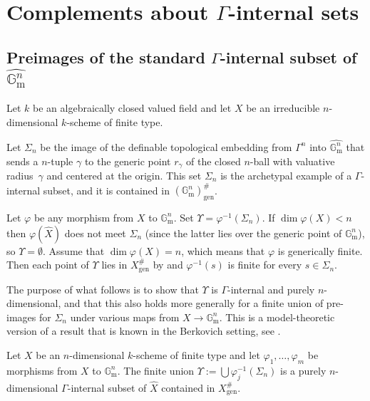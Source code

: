 \documentclass[JEP,XML,SOM,Unicode,ThmDefs,NoEqCountersInSection,published]{cedram}
\newcommand{\gm}{\bG_{\mathrm m}}
\newcommand{\bG}{\mathbb G}
\let\phi\varphi
\theoremstyle{plain}
\theoremstyle{definition}
\begin{document}
\section{Complements about \texorpdfstring{$\Gamma$}{G}-internal sets}

\subsection{Preimages of the standard $\Gamma$-internal subset of
$\widehat{\gm^n}$}\label{ss-preimsn}
Let $k$ be an algebraically
closed valued field
and let $X$ be an irreducible
$n$\nobreakdash-dimen\-sional $k$-scheme of finite type.

Let
$\Sigma_n$ be the image of the definable topological embedding from $\Gamma^n$ into $\widehat{\gm^n}$
that sends a $n$-tuple $\gamma$ to the generic point $r_\gamma$ of the closed $n$-ball with valuative radius~$\gamma$ and centered at the origin.
This set
$\Sigma_n$ is the archetypal example of a $\Gamma$-internal subset, and it is contained in $(\gm^n)^{\#}_{\mathrm{gen}}$.

Let $\phi$ be any morphism from $X$ to $\gm^n$. Set
$\Upsilon=\phi^{-1}(\Sigma_n)$.
If $\dim\phi(X)<n$ then $\phi(\widehat X)$ does not meet $\Sigma_n$ (since the latter lies over
the generic point of $\gm^n$), so $\Upsilon=\emptyset$.
Assume that $\dim \phi(X)=n$, which means that $\phi$ is generically finite.
Then each point of $\Upsilon$ lies in $X^\#_{\mathrm{gen}}$ by \cite[Prop.\,8.1.2]{HL}
and $\phi^{-1}(s)$ is finite for every $s\in \Sigma_n$.

The purpose of what follows is to show that $\Upsilon$
is $\Gamma$-internal and purely $n$\nobreakdash-dimen\-sional, and that this
also holds more generally for a finite union of pre-images
for $\Sigma_n$ under various
maps from
$X\to \gm^n$.
This is a model-theoretic version of a result that is known in the Berkovich setting, see \cite[Th.\,5.1]{confluentes}.

\begin{theo}\label{theo-union-skeleta}
Let $X$ be an $n$\nobreakdash-dimen\-sional $k$-scheme of finite type and let $\phi_1,\ldots, \phi_m$ be morphisms
from $X$ to $\gm^n$. The finite union
$\Upsilon:=\bigcup \phi_j^{-1}(\Sigma_n)$ is a purely $n$\nobreakdash-dimen\-sional
$\Gamma$-internal subset of $\widehat X$ contained in $X^\#_{\mathrm{gen}}$.
\end{theo}
\end{document}
